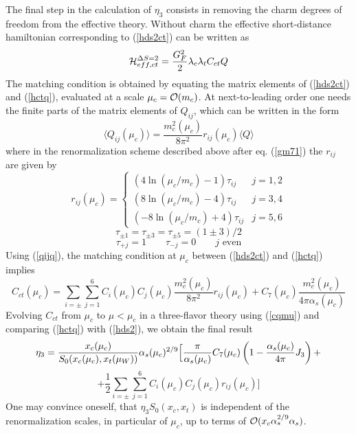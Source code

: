 The final step in the calculation of $\eta_3$ consists in removing
the charm degrees of freedom from the effective theory.
Without charm the effective short-distance hamiltonian corresponding
to (\ref{hds2ct}) can be written as 
\begin{equation}\label{hctq}
{\cal H}^{\Delta S=2}_{eff,ct}=\frac{G^2_F}{2}\lambda_c\lambda_t
C_{ct}  Q
\end{equation}
The matching condition is obtained by equating the matrix elements of
(\ref{hds2ct}) and (\ref{hctq}), evaluated at a scale 
$\mu_c={\cal O}(m_c)$. At next-to-leading order one needs the finite
parts of the matrix elements of $Q_{ij}$, which can be written in the
form
\begin{equation}\label{qijq}
\langle Q_{ij}(\mu_c)\rangle=\frac{m^2_c(\mu_c)}{8\pi^2}
r_{ij}(\mu_c)\langle Q\rangle
\end{equation}
where in the renormalization scheme described above after eq. (\ref{gm71})
the $r_{ij}$ are given by
\begin{equation}\label{rijt}
r_{ij}(\mu_c)=
\left\{ \begin{array}{ll}
(4\ln(\mu_c/m_c)-1)\tau_{ij} & j=1,2 \\
(8\ln(\mu_c/m_c)-4)\tau_{ij} & j=3,4 \\
(-8\ln(\mu_c/m_c)+4)\tau_{ij} & j=5,6 \end{array}\right.
\end{equation}
\begin{equation}\label{tjodd}
\tau_{\pm 1}=\tau_{\pm 3}=\tau_{\pm 5}=(1\pm 3)/2
\end{equation}
\begin{equation}\label{tjevn}
\tau_{+j}=1\qquad \tau_{-j}=0\qquad  \mbox{$j$ even}
\end{equation}
Using (\ref{qijq}), the matching condition at $\mu_c$ between
(\ref{hds2ct}) and (\ref{hctq}) implies
\begin{equation}\label{cctmuc}
C_{ct}(\mu_c)=\sum_{i=\pm}\sum_{j=1}^6 C_i(\mu_c) C_j(\mu_c)
\frac{m^2_c(\mu_c)}{8\pi^2}r_{ij}(\mu_c)+C_7(\mu_c)
\frac{m^2_c(\mu_c)}{4\pi\alpha_s(\mu_c)}
\end{equation}
Evolving $C_{ct}$ from $\mu_c$ to $\mu<\mu_c$ in a three-flavor theory
using (\ref{cqmu}) and comparing (\ref{hctq}) with (\ref{hds2}), 
we obtain the final result
\begin{displaymath}
\eta_3=\frac{x_c(\mu_c)}{S_0(x_c(\mu_c),x_t(\mu_W))}\alpha_s(\mu_c)^{2/9}
\Bigl[ \frac{\pi}{\alpha_s(\mu_c)}C_7(\mu_c)
\left(1-\frac{\alpha_s(\mu_c)}{4\pi}J_3\right)+ 
\end{displaymath}
\begin{equation}\label{eta3}
 +\frac{1}{2}\sum_{i=\pm}\sum_{j=1}^6 C_i(\mu_c) C_j(\mu_c)
r_{ij}(\mu_c)\Bigr] 
\end{equation}
One may convince oneself, that $\eta_3 S_0(x_c,x_t)$ is independent of the 
renormalization scales, in particular of $\mu_c$, up to terms of 
${\cal O}(x_c \alpha^{2/9}_s \alpha_s)$. 

